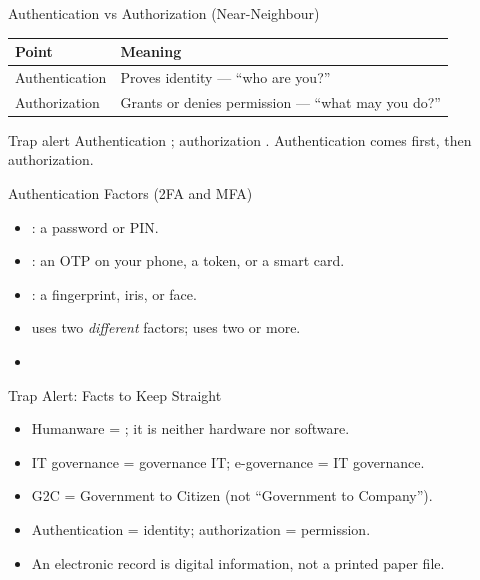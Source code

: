 \documentclass[aspectratio=169]{beamer}
\begin{document}
\begin{frame}{Authentication vs Authorization (Near-Neighbour)}
  \begin{center}
    \begin{tabular}{p{}p{}}
      \toprule
      \textbf{Point} & \textbf{Meaning} \\
      \midrule
      Authentication & Proves identity --- ``who are you?'' \\
      Authorization & Grants or denies permission --- ``what may you do?'' \\
      \bottomrule
    \end{tabular}
  \end{center}
  \vspace{0.3cm}
  \begin{alertblock}{Trap alert}
    Authentication ; authorization .
    Authentication comes first, then authorization.
  \end{alertblock}
\end{frame}

\begin{frame}{Authentication Factors (2FA and MFA)}
  \begin{itemize}
    \item {}: a password or PIN.
    \item {}: an OTP on your phone, a token, or a smart
      card.
    \item {}: a fingerprint, iris, or face.
    \item {} uses two \emph{different}
      factors;  uses two or more.
    \item {}
  \end{itemize}
\end{frame}

\begin{frame}{Trap Alert: Facts to Keep Straight}
  \begin{itemize}
    \item Humanware = ; it is neither hardware nor software.
    \item IT governance = governance  IT; e-governance = IT 
      governance.
    \item G2C = Government to Citizen (not ``Government to Company'').
    \item Authentication = identity; authorization = permission.
    \item An electronic record is digital information, not a printed paper
      file.
  \end{itemize}
\end{frame}
\end{document}
